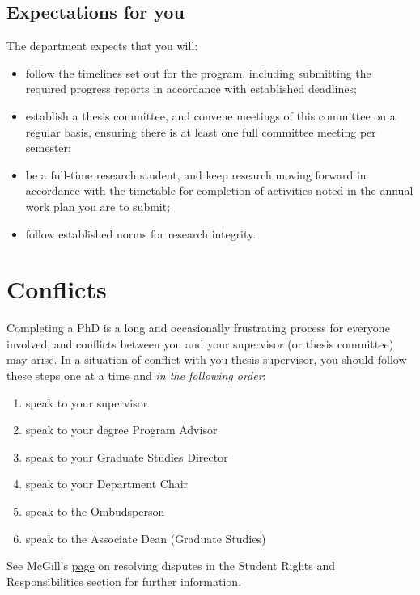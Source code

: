 \documentclass[
  letterpaper,
  DIV=11,
  numbers=noendperiod]{scrreprt}
\providecommand{\tightlist}{%
  \setlength{\itemsep}{0pt}\setlength{\parskip}{0pt}}
\begin{document}
\subsection{Expectations for you}\label{expectations-for-you}

The department expects that you will:

\begin{itemize}
\tightlist
\item
  follow the timelines set out for the program, including submitting the
  required progress reports in accordance with established deadlines;
\item
  establish a thesis committee, and convene meetings of this committee
  on a regular basis, ensuring there is at least one full committee
  meeting per semester;
\item
  be a full-time research student, and keep research moving forward in
  accordance with the timetable for completion of activities noted in
  the annual work plan you are to submit;
\item
  follow established norms for research integrity.
\end{itemize}

\section{Conflicts}\label{conflicts}

Completing a PhD is a long and occasionally frustrating process for
everyone involved, and conflicts between you and your supervisor (or
thesis committee) may arise. In a situation of conflict with you thesis
supervisor, you should follow these steps one at a time and \emph{in the
following order}:

\begin{enumerate}
\def\labelenumi{\arabic{enumi}.}
\tightlist
\item
  speak to your supervisor
\item
  speak to your degree Program Advisor
\item
  speak to your Graduate Studies Director
\item
  speak to your Department Chair
\item
  speak to the Ombudsperson
\item
  speak to the Associate Dean (Graduate Studies)
\end{enumerate}

See McGill's \href{www.mcgill.ca/students/srr/disputes}{page} on
resolving disputes in the Student Rights and Responsibilities section
for further information.
\end{document}
